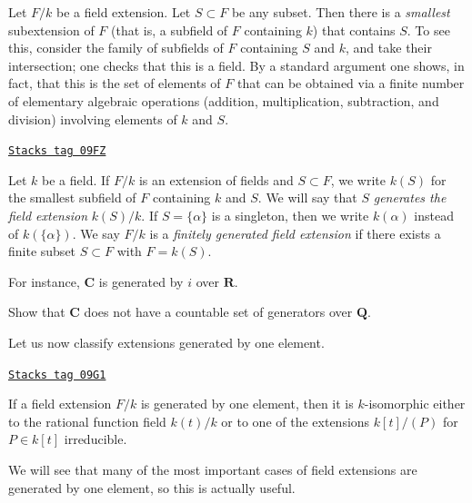 Let $F/k$ be a field extension. Let $S \subset F$ be any subset.
Then there is a {\it smallest} subextension of $F$ (that is, a subfield of
$F$ containing $k$) that contains $S$. To see this, consider the family of
subfields of $F $ containing $S$ and $k$, and take their intersection; one
checks that this is a field. By a standard argument one shows, in fact, that
this is the set of elements of $F$ that can be obtained via a finite number
of elementary algebraic operations (addition, multiplication, subtraction,
and division) involving elements of $k$ and $S$.

\begin{definition}[Generated by]
\label{fields-definition-generated-by}
\href{https://stacks.math.columbia.edu/tag/09FZ}{\texttt{Stacks tag 09FZ}}

Let $k$ be a field. If $F/k$ is an extension of fields and
$S \subset F$, we write $k(S)$ for the smallest subfield of $F$
containing $k$ and $S$. We will say that $S$ {\it generates the
field extension} $k(S)/k$. If $S = \{\alpha\}$ is a singleton, then we
write $k(\alpha)$ instead of $k(\{\alpha\})$. We say $F/k$ is a
{\it finitely generated field extension} if there exists a
finite subset $S \subset F$ with $F = k(S)$.
\end{definition}

For instance, $\mathbf{C}$ is generated by $i$ over $\mathbf{R}$.

\begin{exercise}
\label{exercise-C-not-countably-generated}
Show that $\mathbf{C}$ does not have a countable set of generators over
$\mathbf{Q}$.
\end{exercise}

Let us now classify extensions generated by one element.

\begin{lemma}

\label{fields-lemma-field-extension-generated-by-one-element}
\href{https://stacks.math.columbia.edu/tag/09G1}{\texttt{Stacks tag 09G1}}

If a field extension $F/k$ is generated by one element, then it is
$k$-isomorphic either to the rational function field $k(t)/k$ or to one
of the extensions $k[t]/(P)$ for $P \in k[t]$ irreducible.
\end{lemma}

We will see that many of the most important cases of field extensions are
generated by one element, so this is actually useful.

